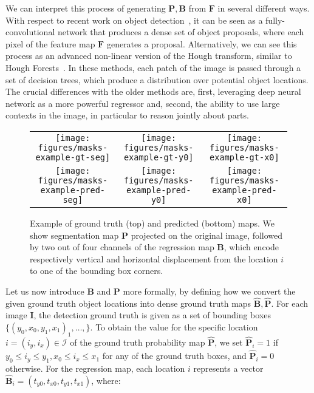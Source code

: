 \documentclass[10pt,twocolumn,letterpaper]{article}
\newcommand{\bF}[0]{\mathbf{F}}
\newcommand{\bP}[0]{\mathbf{P}}
\newcommand{\bB}[0]{\mathbf{B}}
\newcommand{\bI}[0]{\mathbf{I}}
\newcommand{\mI}[0]{\mathcal{I}}
\begin{document}
We can interpret this
process of generating $\bP, \bB$ from $\bF$ in several different ways. With
respect to recent work on object
detection~\cite{Girshick2015,Redmon2016,Ren2015}, it can be seen as a
fully-convolutional network that produces a dense set of object proposals, where
each pixel of the feature map $\bF$ generates a proposal. Alternatively, we
can see this process as an advanced non-linear version of the Hough transform,
similar to Hough Forests~\cite{Gall2011, Barinova2012}. In these methods, each
patch of the image is passed through a set of decision trees, which produce a
distribution over potential object locations. The crucial differences with the
older methods are, first, leveraging deep neural network as a more powerful 
regressor and, second, the ability to use large contexts in the image, in 
particular to reason jointly about parts. 

\begin{figure}
\begin{center}
\begin{tabular}{ccc}
\texttt{[image: figures/masks-example-gt-seg]} &
\texttt{[image: figures/masks-example-gt-y0]} &
\texttt{[image: figures/masks-example-gt-x0]} \\
\texttt{[image: figures/masks-example-pred-seg]} &
\texttt{[image: figures/masks-example-pred-y0]} &
\texttt{[image: figures/masks-example-pred-x0]} \\
\end{tabular}
\end{center}
\vspace{-0.25cm}
\caption{Example of ground truth (top) and predicted (bottom) maps. We show
  segmentation map $\bP$ projected on the original image, followed by two out of four
  channels of the regression map $\bB$, which encode respectively vertical and horizontal displacement from the location $i$ to one of the bounding box corners.}
\label{fi:method:dense-maps}
\vspace{-0.5cm}
\end{figure}

Let us now introduce $\bB$ and $\bP$ more formally, by defining how we convert
the given ground truth object locations into dense ground truth maps
$\hat{\bB}, \hat{\bP}$. For each image $\bI$, the detection ground truth is 
given as a set of bounding boxes
$\{ (y_0,x_0,y_1,x_1)_1, \ldots, \}$. To obtain the
value for the specific location $i = (i_y, i_x) \in \mI$ of the ground truth
probability map $\hat{\bP}$, we set $\hat{\bP}_{i} = 1$ if 
$y_0 \leq i_y \leq y_1, x_0 \leq i_x \leq x_1$ for any of the ground truth boxes,
and $\hat{\bP}_{i} = 0$ otherwise. 
For the regression map, each location $i$ represents a vector 
$\hat{\bB}_{i} = (t_{y0}, t_{x0}, t_{y1}, t_{x1})$, where:
\end{document}
